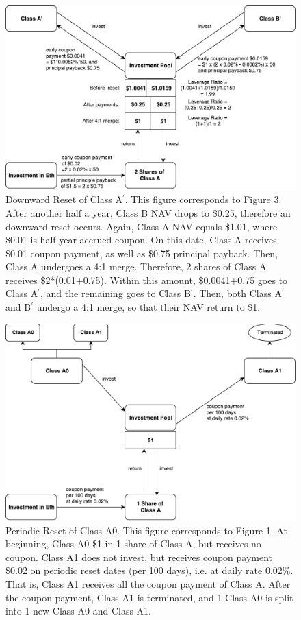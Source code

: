 \documentclass[10pt]{amsart}
\begin{document}
\begin{figure}
\includegraphics[width=\textwidth]{Ap_downward.pdf}
\caption{Downward Reset of Class A$^\prime$. This figure corresponds to Figure 3. After another half a year, Class B NAV drops to \$0.25, therefore an downward reset occurs. Again, Class A NAV equals \$1.01, where \$0.01 is half-year accrued coupon. On this date, Class A receives \$0.01 coupon payment, as well as \$0.75 principal payback. Then, Class A undergoes a 4:1 merge. Therefore, 2 shares of Class A receives \$2*(0.01+0.75). Within this amount, \$0.0041+0.75 goes to Class A$^\prime$, and the remaining goes to Class B$^\prime$. Then, both Class A$^\prime$ and B$^\prime$ undergo a 4:1 merge, so that their NAV return to \$1.}
\end{figure}

\begin{figure}
\includegraphics[width=\textwidth]{A0_periodic.pdf}
\caption{Periodic Reset of Class A0. This figure corresponds to Figure 1. At beginning, Class A0 \$1 in 1 share of Class A, but receives no coupon. Class A1 does not invest, but receives coupon payment \$0.02 on periodic reset dates (per 100 days), i.e. at daily rate 0.02\%. That is, Class A1 receives all the coupon payment of Class A. After the coupon payment, Class A1 is terminated, and 1 Class A0 is split into 1 new Class A0 and Class A1.}
\end{figure}
\end{document}

